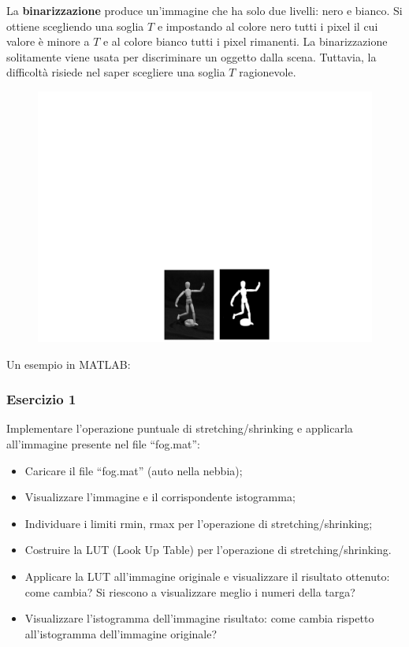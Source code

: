 \documentclass[a4paper]{article}
\newcommand{\dquotes}[1]{``#1''}
\begin{document}
	La \textcolor{Red3}{\textbf{binarizzazione}} produce un'immagine che ha solo due livelli: nero e bianco. Si ottiene scegliendo una soglia $T$ e impostando al colore nero tutti i pixel il cui valore è minore a $T$ e al colore bianco tutti i pixel rimanenti. La binarizzazione solitamente viene usata per discriminare un oggetto dalla scena. Tuttavia, la difficoltà risiede nel saper scegliere una soglia $T$ ragionevole.
	\begin{figure}[!htp]
		\centering
		\includegraphics[width=.6\textwidth]{img/lab/binarizzazione.pdf}
	\end{figure}
	
	\noindent
	Un esempio in MATLAB:
	\newpage
		
	\subsubsection{Esercizio 1}
	
	Implementare l'operazione puntuale di stretching/shrinking e applicarla all'immagine presente nel file \dquotes{\textsf{fog.mat}}:
	\begin{itemize}
		\item Caricare il file \dquotes{\textsf{fog.mat}} (auto nella nebbia);
		
		\item Visualizzare l'immagine e il corrispondente istogramma;
		
		\item Individuare i limiti \textsf{rmin}, \textsf{rmax} per l'operazione di stretching/shrinking;
		
		\item Costruire la LUT (Look Up Table) per l'operazione di stretching/shrinking.
		
		\item Applicare la LUT all'immagine originale e visualizzare il risultato ottenuto: come cambia? Si riescono a visualizzare meglio i numeri della targa?
		
		\item Visualizzare l'istogramma dell'immagine risultato: come cambia rispetto all'istogramma dell'immagine originale?
	\end{itemize}
	
\end{document}
